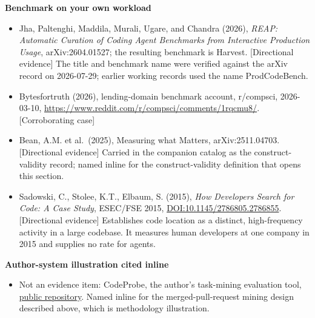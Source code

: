 \textbf{Benchmark on your own workload}

\begin{itemize}
\tightlist
\item
  Jha, Paltenghi, Maddila, Murali, Ugare, and Chandra (2026), \emph{REAP: Automatic Curation of Coding Agent Benchmarks from Interactive Production Usage}, arXiv:2604.01527; the resulting benchmark is Harvest. {[}Directional evidence{]} The title and benchmark name were verified against the arXiv record on 2026-07-29; earlier working records used the name ProdCodeBench.
\item
  Bytesfortruth (2026), lending-domain benchmark account, r/compsci, 2026-03-10, \url{https://www.reddit.com/r/compsci/comments/1rqcmu8/}. {[}Corroborating case{]}
\item
  Bean, A.M. et al.~(2025), Measuring what Matters, arXiv:2511.04703. {[}Directional evidence{]} Carried in the companion catalog as the construct-validity record; named inline for the construct-validity definition that opens this section.
\item
  Sadowski, C., Stolee, K.T., Elbaum, S. (2015), \emph{How Developers Search for Code: A Case Study}, ESEC/FSE 2015, \href{https://doi.org/10.1145/2786805.2786855}{DOI:10.1145/2786805.2786855}. {[}Directional evidence{]} Establishes code location as a distinct, high-frequency activity in a large codebase. It measures human developers at one company in 2015 and supplies no rate for agents.
\end{itemize}

\textbf{Author-system illustration cited inline}

\begin{itemize}
\tightlist
\item
  Not an evidence item: CodeProbe, the author's task-mining evaluation tool, \href{https://github.com/sjarmak/codeprobe}{public repository}. Named inline for the merged-pull-request mining design described above, which is methodology illustration.
\end{itemize}
